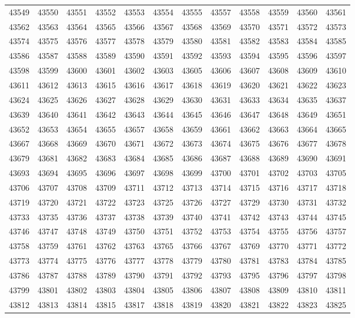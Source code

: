 \begin{center}
\begin{longtable}{llllllllllll}
43549 &43550 &43551 &43552 &43553 &43554 &43555 &43557 &43558 &43559 &43560 &43561 \\
43562 &43563 &43564 &43565 &43566 &43567 &43568 &43569 &43570 &43571 &43572 &43573 \\
43574 &43575 &43576 &43577 &43578 &43579 &43580 &43581 &43582 &43583 &43584 &43585 \\
43586 &43587 &43588 &43589 &43590 &43591 &43592 &43593 &43594 &43595 &43596 &43597 \\
43598 &43599 &43600 &43601 &43602 &43603 &43605 &43606 &43607 &43608 &43609 &43610 \\
43611 &43612 &43613 &43615 &43616 &43617 &43618 &43619 &43620 &43621 &43622 &43623 \\
43624 &43625 &43626 &43627 &43628 &43629 &43630 &43631 &43633 &43634 &43635 &43637 \\
43639 &43640 &43641 &43642 &43643 &43644 &43645 &43646 &43647 &43648 &43649 &43651 \\
43652 &43653 &43654 &43655 &43657 &43658 &43659 &43661 &43662 &43663 &43664 &43665 \\
43667 &43668 &43669 &43670 &43671 &43672 &43673 &43674 &43675 &43676 &43677 &43678 \\
43679 &43681 &43682 &43683 &43684 &43685 &43686 &43687 &43688 &43689 &43690 &43691 \\
43693 &43694 &43695 &43696 &43697 &43698 &43699 &43700 &43701 &43702 &43703 &43705 \\
43706 &43707 &43708 &43709 &43711 &43712 &43713 &43714 &43715 &43716 &43717 &43718 \\
43719 &43720 &43721 &43722 &43723 &43725 &43726 &43727 &43729 &43730 &43731 &43732 \\
43733 &43735 &43736 &43737 &43738 &43739 &43740 &43741 &43742 &43743 &43744 &43745 \\
43746 &43747 &43748 &43749 &43750 &43751 &43752 &43753 &43754 &43755 &43756 &43757 \\
43758 &43759 &43761 &43762 &43763 &43765 &43766 &43767 &43769 &43770 &43771 &43772 \\
43773 &43774 &43775 &43776 &43777 &43778 &43779 &43780 &43781 &43783 &43784 &43785 \\
43786 &43787 &43788 &43789 &43790 &43791 &43792 &43793 &43795 &43796 &43797 &43798 \\
43799 &43801 &43802 &43803 &43804 &43805 &43806 &43807 &43808 &43809 &43810 &43811 \\
43812 &43813 &43814 &43815 &43817 &43818 &43819 &43820 &43821 &43822 &43823 &43825 \\

\end{longtable}
\end{center}
